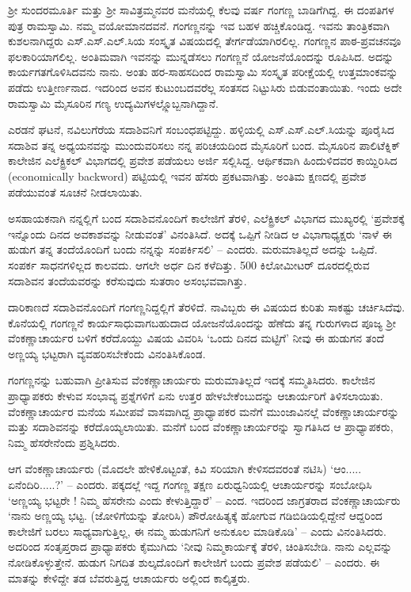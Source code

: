 ಶ್ರೀ ಸುಂದರಮೂರ್ತಿ ಮತ್ತು ಶ್ರೀ ಸಾವಿತ್ರಮ್ಮನವರ ಮನೆಯಲ್ಲಿ ಕೆಲವು ವರ್ಷ ಗಂಗಣ್ಣ ಬಾಡಿಗೆಗಿದ್ದ. ಈ ದಂಪತಿಗಳ ಪುತ್ರ ರಾಮಸ್ವಾಮಿ. ನಮ್ಮ ವಯೋಮಾನದವನೆ. ಗಂಗಣ್ಣನನ್ನು ಇವ ಬಹಳ ಹಚ್ಚಿಕೊಂಡಿದ್ದ. ಇವನು ತಾಂತ್ರಿಕವಾಗಿ ಕುಶಲನಾಗಿದ್ದರು ಎಸ್.ಎಸ್.ಎಲ್.ಸಿಯ ಸಂಸ್ಕೃತ ವಿಷಯದಲ್ಲಿ ತೇರ್ಗಡೆಯಾಗಿರಲಿಲ್ಲ. ಗಂಗಣ್ಣನ ಪಾಠ-ಪ್ರವಚನವೂ ಫಲಕಾರಿಯಾಗಲಿಲ್ಲ. ಅಂತಿಮವಾಗಿ ಇವನನ್ನು ಮುನ್ನಡೆಸಲು ಗಂಗಣ್ಣನೆ ಯೋಜನೆಯೊಂದನ್ನು ರೂಪಿಸಿದ. ಅದನ್ನು ಕಾರ್ಯಗತಗೊಳಿಸಿದವನು ನಾನು. ಅಂತು ಹರ-ಸಾಹಸದಿಂದ ರಾಮಸ್ವಾಮಿ ಸಂಸ್ಕೃತ ಪರೀಕ್ಷೆಯಲ್ಲಿ ಉತ್ತಮಾಂಕವನ್ನು ಪಡೆದು ಉತ್ತೀರ್ಣನಾದ. ಇದರಿಂದ ಅವನ ಕುಟುಂಬದವರೆಲ್ಲ ಸಂತಸದ ನಿಟ್ಟುಸಿರು ಬಿಡುವಂತಾಯಿತು. ಇಂದು ಅದೇ ರಾಮಸ್ವಾಮಿ ಮೈಸೂರಿನ ಗಣ್ಯ ಉದ್ಯಮಿಗಳಲ್ಲ್ಲೊಬ್ಬನಾಗಿದ್ದಾನೆ.

ಎರಡನೆ ಘಟನೆ, ನವಿಲುಗೆರೆಯ ಸದಾಶಿವನಿಗೆ ಸಂಬಂಧಪಟ್ಟಿದ್ದು. ಹಳ್ಳಿಯಲ್ಲಿ ಎಸ್.ಎಸ್.ಎಲ್.ಸಿಯನ್ನು ಪೂರೈಸಿದ ಸದಾಶಿವ ತನ್ನ ಅಧ್ಯಯನವನ್ನು ಮುಂದುವರಿಸಲು ನನ್ನ ಪರಿಚಯದಿಂದ ಮೈಸೂರಿಗೆ ಬಂದ. ಮೈಸೂರಿನ ಪಾಲಿಟೆಕ್ನಿಕ್ ಕಾಲೇಜಿನ ಎಲೆಕ್ಟ್ರಿಕಲ್ ವಿಭಾಗದಲ್ಲಿ ಪ್ರವೇಶ ಪಡೆಯಲು ಅರ್ಜಿ ಸಲ್ಲಿಸಿದ್ದ. ಆರ್ಥಿಕವಾಗಿ ಹಿಂದುಳಿದವರ ಕಾಯ್ದಿರಿಸಿದ (economically backword) ಪಟ್ಟಿಯಲ್ಲಿ ಇವನ ಹೆಸರು ಪ್ರಕಟವಾಗಿತ್ತು. ಅಂತಿಮ ಕ್ಷಣದಲ್ಲಿ ಪ್ರವೇಶ ಪಡೆಯುವಂತೆ ಸೂಚನೆ ನೀಡಲಾಯಿತು.

ಅಸಹಾಯಕನಾಗಿ ನನ್ನಲ್ಲಿಗೆ ಬಂದ ಸದಾಶಿವನೊಂದಿಗೆ ಕಾಲೇಜಿಗೆ ತೆರಳಿ, ಎಲೆಕ್ಟ್ರಿಕಲ್ ವಿಭಾಗದ ಮುಖ್ಯರಲ್ಲಿ ‘ಪ್ರವೇಶಕ್ಕೆ ಇನ್ನೊಂದು ದಿನದ ಅವಕಾಶವನ್ನು ನೀಡುವಂತೆ’ ವಿನಂತಿಸಿದೆ. ಅದಕ್ಕೆ ಒಪ್ಪಿಗೆ ನೀಡಿದ ಆ ವಿಭಾಗಾಧ್ಯಕ್ಷರು ‘ನಾಳೆ ಈ ಹುಡುಗ ತನ್ನ ತಂದೆಯೊಂದಿಗೆ ಬಂದು ನನ್ನನ್ನು ಸಂಪರ್ಕಿಸಲಿ’ – ಎಂದರು. ಮರುಮಾತಿಲ್ಲದೆ ಅದನ್ನು ಒಪ್ಪಿದೆ. ಸಂಪರ್ಕ ಸಾಧನಗಳಿಲ್ಲದ ಕಾಲವದು. ಆಗಲೇ ಅರ್ಧ ದಿನ ಕಳೆದಿತ್ತು. 500 ಕಿಲೋಮೀಟರ್ ದೂರದಲ್ಲಿರುವ ಸದಾಶಿವನ ತಂದೆಯವರನ್ನು ಕರೆಸುವುದು ಸುತರಾಂ ಅಸಂಭವವಾಗಿತ್ತು. 

ದಾರಿಕಾಣದೆ ಸದಾಶಿವನೊಂದಿಗೆ ಗಂಗಣ್ಣನಿದ್ದಲ್ಲಿಗೆ ತೆರಳಿದೆ. ನಾವಿಬ್ಬರು ಈ ವಿಷಯದ ಕುರಿತು ಸಾಕಷ್ಟು ಚರ್ಚಿಸಿದೆವು. ಕೊನೆಯಲ್ಲಿ ಗಂಗಣ್ಣನೆ ಕಾರ್ಯಸಾಧುವಾಗಬಹುದಾದ ಯೋಜನೆಯೊಂದನ್ನು ಹೆಣೆದು ತನ್ನ ಗುರುಗಳಾದ ಪೂಜ್ಯ ಶ್ರೀ ವೆಂಕಣ್ಣಾಚಾರ್ಯರ ಬಳಿಗೆ ಕರೆದೊಯ್ದು ವಿಷಯ ವಿವರಿಸಿ ‘ಒಂದು ದಿನದ ಮಟ್ಟಿಗೆ’ ನೀವು ಈ ಹುಡುಗನ ತಂದೆ ಅಣ್ಣಯ್ಯ ಭಟ್ಟರಾಗಿ ವ್ಯವಹರಿಸಬೇಕೆಂದು ವಿನಂತಿಸಿಕೊಂಡ.

ಗಂಗಣ್ಣನನ್ನು ಬಹುವಾಗಿ ಪ್ರೀತಿಸುವ ವೆಂಕಣ್ಣಾಚಾರ್ಯರು ಮರುಮಾತಿಲ್ಲದೆ ಇದಕ್ಕೆ ಸಮ್ಮತಿಸಿದರು. ಕಾಲೇಜಿನ ಪ್ರಾಧ್ಯಾಪಕರು ಕೇಳುವ ಸಂಭಾವ್ಯ ಪ್ರಶ್ನೆಗಳಿಗೆ ಏನು ಉತ್ತರ ಹೇಳಬೇಕೆಂಬುದನ್ನು ಆಚಾರ್ಯರಿಗೆ ತಿಳಿಸಲಾಯಿತು. ವೆಂಕಣ್ಣಾಚಾರ್ಯರ ಮನೆಯ ಸಮೀಪವೆ ವಾಸವಾಗಿದ್ದ ಪ್ರಾಧ್ಯಾಪಕರ ಮನೆಗೆ ಮುಂಜಾವಿನಲ್ಲೆ ವೆಂಕಣ್ಣಾಚಾರ್ಯರನ್ನು ಮತ್ತು ಸದಾಶಿವನನ್ನು ಕರೆದೊಯ್ಯಲಾಯಿತು. ಮನೆಗೆ ಬಂದ ವೆಂಕಣ್ಣಾಚಾರ್ಯರನ್ನು ಸ್ವಾಗತಿಸಿದ ಆ ಪ್ರಾಧ್ಯಾಪಕರು, ನಿಮ್ಮ ಹೆಸರೇನೆಂದು ಪ್ರಶ್ನಿಸಿದರು. 

ಆಗ ವೆಂಕಣ್ಣಾಚಾರ್ಯರು (ಮೊದಲೇ ಹೇಳಿಕೊಟ್ಟಂತೆ, ಕಿವಿ ಸರಿಯಾಗಿ ಕೇಳಿಸದವರಂತೆ ನಟಿಸಿ) ‘ಆಂ..... ಏನೆಂದಿರಿ.....?’ – ಎಂದರು. ಪಕ್ಕದಲ್ಲೆ ಇದ್ದ ಗಂಗಣ್ಣ ತಕ್ಷಣ ಏರುಧ್ವನಿಯಲ್ಲಿ ಆಚಾರ್ಯರನ್ನು ಸಂಬೋಧಿಸಿ ‘ಅಣ್ಣಯ್ಯ ಭಟ್ಟರೇ ! ನಿಮ್ಮ ಹೆಸರೇನು ಎಂದು ಕೇಳುತ್ತಿದ್ದಾರೆ’ – ಎಂದ. ಇದರಿಂದ ಜಾಗ್ರತರಾದ ವೆಂಕಣ್ಣಾಚಾರ್ಯರು ‘ನಾನು ಅಣ್ಣಯ್ಯ ಭಟ್ಟ. (ಜೋಳಿಗೆಯನ್ನು ತೋರಿಸಿ) ಪೌರೋಹಿತ್ಯಕ್ಕೆ ಹೋಗುವ ಗಡಿಬಿಡಿಯಲ್ಲಿದ್ದೇನೆ ಆದ್ದರಿಂದ ಕಾಲೇಜಿಗೆ ಬರಲು ಸಾಧ್ಯವಾಗುತ್ತಿಲ್ಲ, ಈ ನಮ್ಮ ಹುಡುಗನಿಗೆ ಅನುಕೂಲ ಮಾಡಿಕೊಡಿ’ – ಎಂದು ವಿನಂತಿಸಿದರು. ಅದರಿಂದ ಸಂತೃಪ್ತರಾದ ಪ್ರಾಧ್ಯಾಪಕರು ಕೈಮುಗಿದು ‘ನೀವು ನಿಮ್ಮಕಾರ್ಯಕ್ಕೆ ತೆರಳಿ, ಚಿಂತಿಸಬೇಡಿ. ನಾನು ಎಲ್ಲವನ್ನು ನೋಡಿಕೊಳ್ಳುತ್ತೇನೆ. ಹುಡುಗ ನಿಗದಿತ ಶುಲ್ಕದೊಂದಿಗೆ ಕಾಲೇಜಿಗೆ ಬಂದು ಪ್ರವೇಶ ಪಡೆಯಲಿ’ – ಎಂದರು. ಈ ಮಾತನ್ನು ಕೇಳಿದ್ದೇ ತಡ ಬೆವರುತ್ತಿದ್ದ ಆಚಾರ್ಯರು ಅಲ್ಲಿಂದ ಕಾಲ್ಕಿತ್ತರು.

